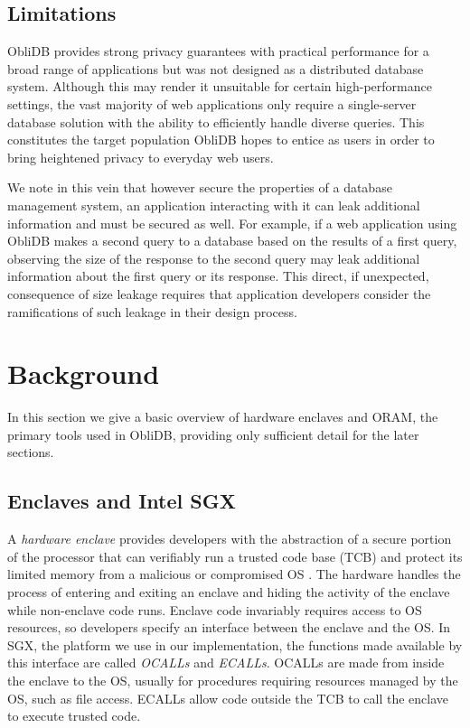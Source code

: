 \documentclass[letterpaper,twocolumn,10pt]{article}
\def\name/{ObliDB}
\begin{document}
\subsection{Limitations}
\name/ provides strong privacy guarantees with practical performance for a broad range of applications but was not designed as a distributed database system. Although this may render it unsuitable for certain high-performance settings, the vast majority of web applications only require a single-server database solution with the ability to efficiently handle diverse queries. This constitutes the target population \name/ hopes to entice as users in order to bring heightened privacy to everyday web users.

We note in this vein that however secure the properties of a database management system, an application interacting with it can leak additional information and must be secured as well. For example, if a web application using \name/ makes a second query to a database based on the results of a first query, observing the size of the response to the second query may leak additional information about the first query or its response. This direct, if unexpected, consequence of size leakage requires that application developers consider the ramifications of such leakage in their design process.

\section{Background}\label{background}
In this section we give a basic overview of hardware enclaves and ORAM, the primary tools used in \name/, providing only sufficient detail for the later sections.

\subsection{Enclaves and Intel SGX}

A \emph{hardware enclave} provides developers with the abstraction of a secure portion of the processor that can verifiably run a trusted code base (TCB) and protect its limited memory from a malicious or compromised OS \cite{CD16, SGXRef}. The hardware handles the process of entering and exiting an enclave and hiding the activity of the enclave while non-enclave code runs. Enclave code invariably requires access to OS resources, so developers specify an interface between the enclave and the OS. In SGX, the platform we use in our implementation, the functions made available by this interface are called \textit{OCALLs} and \textit{ECALLs}. OCALLs are made from inside the enclave to the OS, usually for procedures requiring resources managed by the OS, such as file access. ECALLs allow code outside the TCB to call the enclave to execute trusted code.
\end{document}
